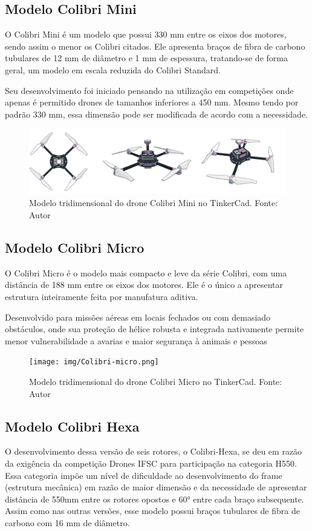 \documentclass[conference]{IEEEtran}
\begin{document}
\subsection{Modelo Colibri Mini}
O Colibri Mini é um modelo que possui 330 mm entre os eixos dos motores, sendo assim o menor os Colibri citados. Ele apresenta braços de fibra de carbono tubulares de 12 mm de diâmetro e 1 mm de espessura, tratando-se de forma geral, um modelo em escala reduzida do Colibri Standard. 

Seu desenvolvimento foi iniciado pensando na utilização em competições onde apenas é permitido drones de tamanhos inferiores a 450 mm. Mesmo tendo por padrão 330 mm, essa dimensão pode ser modificada de acordo com a necessidade.

\begin{figure}[!htb]
    \centering
    \includegraphics[scale=0.14]{img/Colibri-mini.png} 
    \caption{Modelo tridimensional do drone Colibri Mini no TinkerCad. Fonte: Autor}
    \label{fig:my_label}
\end{figure}

\subsection{Modelo Colibri Micro}

O Colibri Micro é o modelo mais compacto e leve da série Colibri, com uma distância de 188 mm entre os eixos dos motores. Ele é o único a apresentar estrutura inteiramente feita por manufatura aditiva.

Desenvolvido para missões aéreas em locais fechados ou com demasiado obstáculos, onde sua proteção de hélice robusta e integrada nativamente permite menor vulnerabilidade a avarias e maior segurança à animais e pessoas

\begin{figure}[!htb]
    \centering
    \texttt{[image: img/Colibri-micro.png]} 
    \caption{Modelo tridimensional do drone Colibri Micro no TinkerCad. Fonte: Autor}
    \label{fig:my_label}
\end{figure}

\subsection{Modelo Colibri Hexa}
O desenvolvimento dessa versão de seis rotores, o Colibri-Hexa, se deu em razão da exigência da competição Drones IFSC para participação na categoria H550. Essa categoria impõe um nível de dificuldade ao desenvolvimento do frame (estrutura mecânica) em razão de maior dimensão e da necessidade de apresentar distância de 550mm entre os rotores opostos e 60° entre cada braço subsequente. Assim como nas outras versões, esse modelo possui braços tubulares de fibra de carbono com 16 mm de diâmetro.
\end{document}
